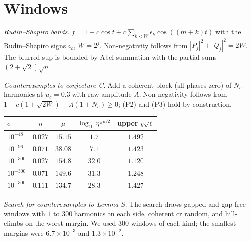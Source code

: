 \section{Windows}
\label{app:windows}

\emph{Rudin--Shapiro bands.}
$f=1+c\cos t+c\sum_{k<W}\epsilon_k\cos((m+k)t)$ with the Rudin--Shapiro signs $\epsilon_k$, $W=2^j$.
Non-negativity follows from $|P_j|^2+|Q_j|^2=2W$.
The blurred sup is bounded by Abel summation with the partial sums $(2+\sqrt2)\sqrt n$.

\emph{Counterexamples to conjecture C.}
Add a coherent block (all phases zero) of $N_c$ harmonics at $u_c=0.3$ with raw amplitude $A$.
Non-negativity follows from $1-c(1+\sqrt{2W})-A(1+N_c)\ge0$; (P2) and (P3) hold by construction.

\begin{center}
\small
\begin{tabular}{lcccc}
$\sigma$ & $\eta$ & $\mu$ & $\log_{10}\eta e^{\mu/2}$ & upper $g\sqrt\ell$\\ \hline
$10^{-48}$ & $0.027$ & $15.15$ & $1.7$ & $1.492$\\
$10^{-96}$ & $0.071$ & $38.08$ & $7.1$ & $1.423$\\
$10^{-300}$ & $0.027$ & $154.8$ & $32.0$ & $1.120$\\
$10^{-300}$ & $0.071$ & $149.6$ & $31.3$ & $1.248$\\
$10^{-300}$ & $0.111$ & $134.7$ & $28.3$ & $1.427$\\
\end{tabular}
\end{center}

\emph{Search for counterexamples to Lemma S.}
The search draws gapped and gap-free windows with $1$ to $300$ harmonics on each side, coherent or random, and hill-climbs on the worst margin.
We used $300$ windows of each kind; the smallest margins were $6.7\times10^{-3}$ and $1.3\times10^{-2}$.
